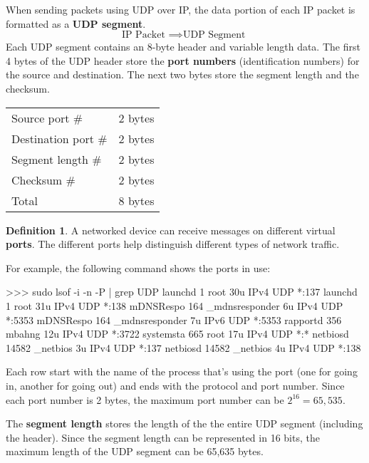 \documentclass[a4paper, 12pt]{report}
\theoremstyle{remark}
\theoremstyle{definition}
\newtheorem{definition}{Definition}[section]
\begin{document}
When sending packets using UDP over IP, the data portion of each IP packet is formatted as a \textbf{UDP segment}. 
\[\text{IP Packet } \implies \text{UDP Segment }\]
Each UDP segment contains an 8-byte header and variable length data. The first 4 bytes of the UDP header store the \textbf{port numbers} (identification numbers) for the source and destination. The next two bytes store the segment length and the checksum. 
\begin{center}
\begin{tabular}{l|l}
    Source port \# & 2 bytes \\
    Destination port \# & 2 bytes \\
    Segment length \# & 2 bytes \\
    Checksum \# & 2 bytes \\
    \hline 
    Total & 8 bytes
\end{tabular}
\end{center}

\begin{definition}
A networked device can receive messages on different virtual \textbf{ports}. The different ports help distinguish different types of network traffic. 
\end{definition}

For example, the following command shows the ports in use: 
\begin{python}
>>> sudo lsof -i -n -P | grep UDP
launchd       1            root   30u  IPv4 UDP *:137
launchd       1            root   31u  IPv4 UDP *:138
mDNSRespo   164  _mdnsresponder    6u  IPv4 UDP *:5353
mDNSRespo   164  _mdnsresponder    7u  IPv6 UDP *:5353
rapportd    356          mbahng   12u  IPv4 UDP *:3722
systemsta   665            root   17u  IPv4 UDP *:*
netbiosd  14582        _netbios    3u  IPv4 UDP *:137
netbiosd  14582        _netbios    4u  IPv4 UDP *:138
\end{python}
Each row start with the name of the process that's using the port (one for going in, another for going out) and ends with the protocol and port number. Since each port number is 2 bytes, the maximum port number can be $2^{16} = 65,535$. 

The \textbf{segment length} stores the length of the the entire UDP segment (including the header). Since the segment length can be represented in 16 bits, the maximum length of the UDP segment can be 65,635 bytes. 
\end{document}
